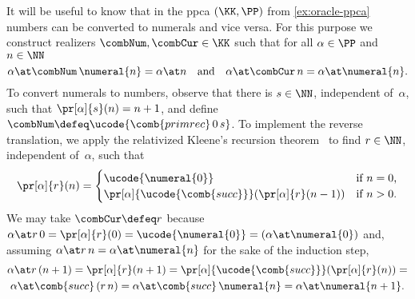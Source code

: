 \begin{example}
  \label{ex:numers-vs-numerals}
  It will be useful to know that in the ppca $(\KK, \PP)$ from \cref{ex:oracle-ppca} numbers can be converted to numerals and vice versa. For this purpose we construct realizers $\combNum, \combCur \in \KK$ such that for all $\alpha \in \PP$ and $n \in \NN$
  \begin{equation*}
    \alpha \at \combNum \, \numeral{n} = \alpha \at n
    \quad\text{and}\quad
    \alpha \at \combCur \, n = \alpha \at \numeral{n}.
  \end{equation*}
  To convert numerals to numbers, observe that there is $s \in \NN$, independent of~$\alpha$, such that $\pr[\alpha]{s}(n) = n + 1$, and define
  $\combNum \defeq \ucode{\comb{primrec} \, 0 \, s}$.
  To implement the reverse translation, we apply
  the relativized Kleene's recursion theorem~\cite[Sect.~III.1.6]{soare87:_recur_enumer_sets_degrees}
  to find $r \in \NN$, independent of~$\alpha$, such that
  \begin{equation*}
    \pr[\alpha]{r}(n) =
    \begin{cases}
      \ucode{\numeral{0}} & \text{if $n = 0$,}\\
      \pr[\alpha]{\ucode{\comb{succ}}}(\pr[\alpha]{r}(n-1)) & \text{if $n > 0$.}
    \end{cases}
  \end{equation*}
  We may take $\combCur \defeq r$ because
  $\alpha \at r \, 0 = \pr[\alpha]{r}(0) = \ucode{\numeral{0}} = (\alpha \at \numeral{0})$
  and, assuming $\alpha \at r \, n = \alpha \at \numeral{n}$ for the sake of the induction step,
  \begin{multline*}
    \alpha \at r \, (n+1) =
    \pr[\alpha]{r}(n+1) =
    \pr[\alpha]{\ucode{\comb{succ}}}(\pr[\alpha]{r}(n)) = \\
    \alpha \at \comb{succ} \, (r \, n) =
    \alpha \at \comb{succ} \, \numeral{n} =
    \alpha \at \numeral{n + 1}.
  \end{multline*}
\end{example}

 